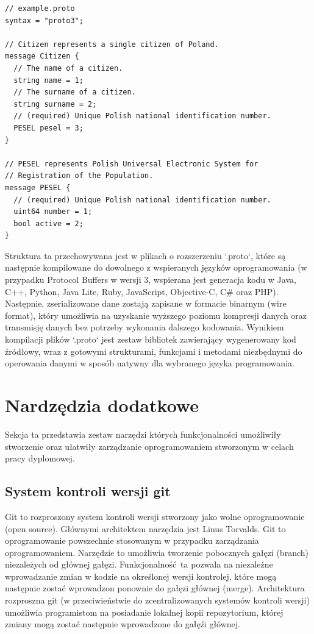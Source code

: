 \documentclass[a4paper,12pt,twoside,openany]{report}
\begin{document}
\begin{lstlisting}
// example.proto
syntax = "proto3";

// Citizen represents a single citizen of Poland.
message Citizen {
  // The name of a citizen.
  string name = 1;
  // The surname of a citizen.
  string surname = 2;
  // (required) Unique Polish national identification number.
  PESEL pesel = 3;
}

// PESEL represents Polish Universal Electronic System for
// Registration of the Population.
message PESEL {
  // (required) Unique Polish national identification number.
  uint64 number = 1;
  bool active = 2;
}
\end{lstlisting}

Struktura ta przechowywana jest w plikach o rozszerzeniu `.proto`, które są następnie kompilowane do dowolnego z wspieranych języków oprogramowania 
(w przypadku Protocol Buffers w wersji 3, wspierana jest generacja kodu w Java, C++, Python, Java Lite, Ruby, JavaScript, Objective-C, C\# oraz PHP).
Następnie, zserializowane dane zostają zapisane w formacie binarnym (wire format), który umożliwia na uzyskanie wyższego poziomu kompresji danych oraz transmisję danych 
bez potrzeby wykonania dalszego kodowania. 
Wynikiem kompilacji plików `.proto` jest zestaw bibliotek zawierający wygenerowany kod źródłowy, wraz z gotowymi strukturami, funkcjami i metodami niezbędnymi do 
operowania danymi w sposób natywny dla wybranego języka programowania.

\section{Nardzędzia dodatkowe}

Sekcja ta przedstawia zestaw narzędzi których funkcjonalności umożliwiły stworzenie oraz ułatwiły zarządzanie oprogramowaniem stworzonym w celach
pracy dyplomowej. 

\subsection{System kontroli wersji git}
Git to rozproszony system kontroli wersji stworzony jako wolne oprogramowanie (open source). 
Głównymi architektem narzędzia jest Linus Torvalds. Git to oprogramowanie powszechnie stosowanym w przypadku zarządzania oprogramowaniem.
Narzędzie to umożliwia tworzenie pobocznych gałęzi (branch) niezależych od głównej gałęzi. Funkcjonalność ta pozwala na niezależne wprowadzanie zmian
w kodzie na określonej wersji kontrolej, które mogą następnie zostać wprowadzon ponownie do gałęzi głównej (merge).
Architektura rozproszna git (w przeciwieństwie do zcentralizowanych systemów kontroli wersji) umożliwia programistom na posiadanie lokalnej kopii repozytorium,
której zmiany mogą zostać następnie wprowadzone do gałęźi głównej.
\end{document}
